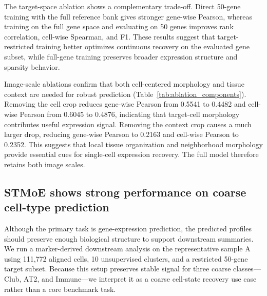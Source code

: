 \documentclass[sigconf]{acmart}
\newcommand{\method}{STMoE\xspace}
\begin{document}
The target-space ablation shows a complementary trade-off. Direct 50-gene training with the full reference bank gives stronger gene-wise Pearson, whereas training on the full gene space and evaluating on 50 genes improves rank correlation, cell-wise Spearman, and F1. These results suggest that target-restricted training better optimizes continuous recovery on the evaluated gene subset, while full-gene training preserves broader expression structure and sparsity behavior.

Image-scale ablations confirm that both cell-centered morphology and tissue context are needed for robust prediction (Table~\ref{tab:ablation_components}). Removing the cell crop reduces gene-wise Pearson from 0.5541 to 0.4482 and cell-wise Pearson from 0.6045 to 0.4876, indicating that target-cell morphology contributes useful expression signal. Removing the context crop causes a much larger drop, reducing gene-wise Pearson to 0.2163 and cell-wise Pearson to 0.2352. This suggests that local tissue organization and neighborhood morphology provide essential cues for single-cell expression recovery. The full model therefore retains both image scales.







\subsection{\method{} shows strong performance on coarse cell-type prediction}

Although the primary task is gene-expression prediction, the predicted profiles should preserve enough biological structure to support downstream summaries. We run a marker-derived downstream analysis on the representative sample A using 111{,}772 aligned cells, 10 unsupervised clusters, and a restricted 50-gene target subset. Because this setup preserves stable signal for three coarse classes---Club, AT2, and Immune---we interpret it as a coarse cell-state recovery use case rather than a core benchmark task.

\end{document}
